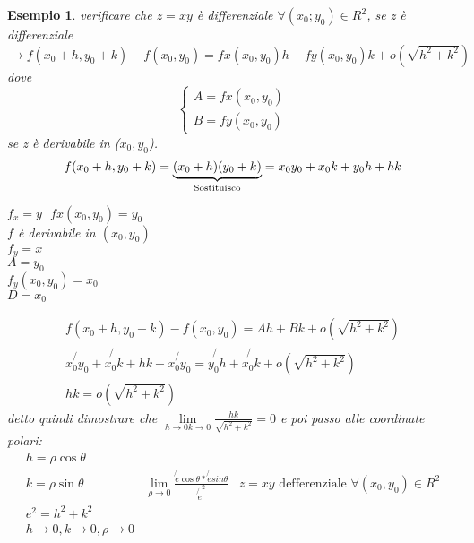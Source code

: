 \documentclass{book}
\newtheorem{esempio}{Esempio}
\begin{document}
\begin{esempio}
  verificare che $z=xy$ è differenziale $\forall (x_0;y_0)\in R^2$, se z è differenziale\\
  $\to f(x_0+h,y_0+k) - f(x_0,y_0)=fx(x_0,y_0)h+fy(x_0,y_0)k+o(\sqrt{h^2+k^2})$ dove
  \begin{equation*}
    \begin{cases}
      A=fx(x_0,y_0)\\
      B=fy(x_0,y_0)
    \end{cases}
  \end{equation*}
  se z è derivabile in ($x_0,y_0$).
  \begin{equation*}
    f(x_0+h,y_0+k) =\underbrace{(x_0+h)(y_0+k)}_{\text{\shortstack{Sostituisco}}}=x_0y_0+x_0k+y_0h+hk
  \end{equation*}
  \begin{multicols}{3}
    $f_x=y\text{ }fx(x_0,y_0)=y_0$\\
    $f$ è derivabile in $(x_0,y_0)$\\
    $f_y=x$\\
    $A=y_0$\\
    $f_y(x_0,y_0)=x_0$\\
    $D=x_0$
  \end{multicols}
  \begin{equation*}
    \begin{matrix}
      f(x_0+h,y_0+k) - f(x_0,y_0)=Ah+Bk+o(\sqrt{h^2+k^2})\\
      \not{x_0y_0}+\not{x_0k}+hk-\not{x_0y_0}=\not{y_0h}+\not{x_0k}+o(\sqrt{h^2+k^2})\\
      hk=o(\sqrt{h^2+k^2})
    \end{matrix}
  \end{equation*}
  detto quindi dimostrare che $\lim\limits_{h\to 0 k\to 0}\frac{hk}{\sqrt{h^2+k^2}}=0$
  e poi passo alle coordinate polari:
  \begin{equation*}
    \begin{matrix}
      h=\rho \cos \theta\\
      k=\rho \sin \theta & \lim\limits_{\rho\to 0} \frac{\not{e} \cos\theta* \not{e} sin\theta}{\not{e}^2}& z=xy \text{ defferenziale } \forall (x_0,y_0)\in R^2\\
      e^2=h^2+k^2\\
      h\to0,k\to 0,\rho \to 0\\
    \end{matrix}
  \end{equation*}  
\end{esempio}
\end{document}
